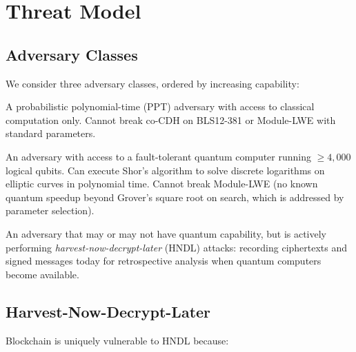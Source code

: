 \section{Threat Model}

\label{sec:threat-model}

\subsection{Adversary Classes}

We consider three adversary classes, ordered by increasing capability:

\begin{definition}
\label{def:classical}
A probabilistic polynomial-time (PPT) adversary with access to classical computation
only. Cannot break co-CDH on BLS12-381 or Module-LWE with standard parameters.
\end{definition}

\begin{definition}
\label{def:quantum}
An adversary with access to a fault-tolerant quantum computer running $\geq 4{,}000$
logical qubits. Can execute Shor's algorithm to solve discrete logarithms on elliptic
curves in polynomial time. Cannot break Module-LWE (no known quantum speedup beyond
Grover's square root on search, which is addressed by parameter selection).
\end{definition}

\begin{definition}
\label{def:transitional}
An adversary that may or may not have quantum capability, but is actively performing
\emph{harvest-now-decrypt-later} (HNDL) attacks: recording ciphertexts and signed
messages today for retrospective analysis when quantum computers become available.
\end{definition}

\subsection{Harvest-Now-Decrypt-Later}

Blockchain is uniquely vulnerable to HNDL because:

